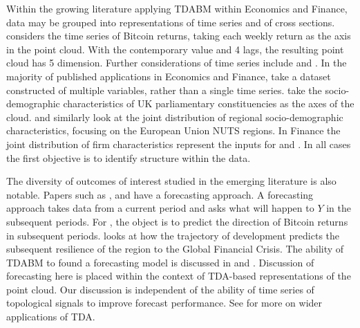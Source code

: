 \documentclass{article}
\begin{document}
Within the growing literature applying TDABM within Economics and Finance, data may be grouped into representations of time series and of cross sections. \cite{rudkin2024return} considers the time series of Bitcoin returns, taking each weekly return as the axis in the point cloud. With the contemporary value and 4 lags, the resulting point cloud has 5 dimension. Further considerations of time series include \cite{rudkin2023regional} and \cite{rudkin2023economic}. In the majority of published applications in Economics and Finance, take a dataset constructed of multiple variables, rather than a single time series. \cite{rudkin2023economic} take the socio-demographic characteristics of UK parliamentary constituencies as the axes of the cloud. \cite{tubadji2025cultural} and \cite{rudkin2024topology} similarly look at the joint distribution of regional socio-demographic characteristics, focusing on the European Union NUTS regions. In Finance the joint distribution of firm characteristics represent the inputs for \cite{dlotko2021financial} and \cite{qiu2020refining}. In all cases the first objective is to identify structure within the data. 

The diversity of outcomes of interest studied in the emerging literature is also notable. Papers such as \cite{rudkin2024return}, \cite{dlotko2021financial} and \cite{qiu2020refining} have a forecasting approach. A forecasting approach takes data from a current period and asks what will happen to $Y$ in the subsequent periods. For \cite{rudkin2024return}, the object is to predict the direction of Bitcoin returns in subsequent periods. \cite{rudkin2023regional} looks at how the trajectory of development predicts the subsequent resilience of the region to the Global Financial Crisis. The ability of TDABM to found a forecasting model is discussed in \cite{rudkin2024return} and \cite{charmpi2023topological}. Discussion of forecasting here is placed within the context of TDA-based representations of the point cloud. Our discussion is independent of the ability of time series of topological signals to improve forecast performance. See \cite{shultz2023applications} for more on wider applications of TDA.
\end{document}
